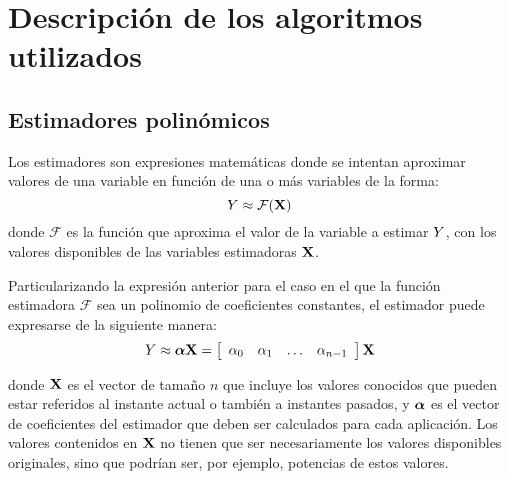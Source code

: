 
\section{Descripción de los algoritmos utilizados}
\label{ch:algoritmos}




\subsection{Estimadores polinómicos}

Los estimadores son expresiones matemáticas donde se intentan aproximar valores de una variable en función de una o más variables de la forma:
%
\begin{equation}
    \estimated \approx \mathcal{F}(\estimation)
\end{equation}
%
donde $\mathcal{F}$ es la función que aproxima el valor de la variable a estimar $\estimated$, con los valores disponibles de las variables estimadoras $\estimation$.


Particularizando la expresión anterior para el caso en el que la función estimadora $\mathcal{F}$ sea un polinomio de coeficientes constantes, el estimador puede expresarse de la siguiente manera:
%
\begin{equation}
    \estimated \approx \coefficients \estimation = \sqbr{\hvect{cccc}{\coefficient_0 & \coefficient_1 & \hdots & \coefficient_{n-1}}} \estimation
\end{equation}

donde $\estimation$ es el vector de tamaño $n$ que incluye los valores conocidos que pueden estar referidos al instante actual o también a instantes pasados, y $\coefficients$ es el vector de coeficientes del estimador que deben ser calculados para cada aplicación. Los valores contenidos en $\estimation$ no tienen que ser necesariamente los valores disponibles originales, sino que podrían ser, por ejemplo, potencias de estos valores.

